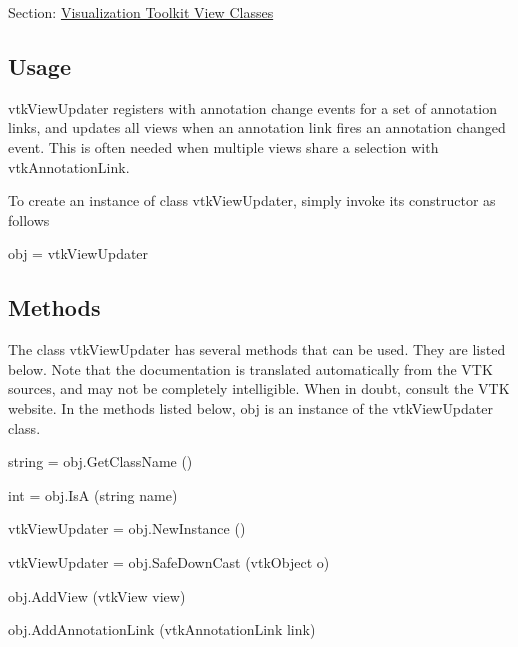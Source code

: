 Section\-: \hyperlink{sec_vtkviews}{Visualization Toolkit View Classes} \hypertarget{vtkwidgets_vtkxyplotwidget_Usage}{}\subsection{Usage}\label{vtkwidgets_vtkxyplotwidget_Usage}
vtk\-View\-Updater registers with annotation change events for a set of annotation links, and updates all views when an annotation link fires an annotation changed event. This is often needed when multiple views share a selection with vtk\-Annotation\-Link.

To create an instance of class vtk\-View\-Updater, simply invoke its constructor as follows \begin{DoxyVerb}  obj = vtkViewUpdater
\end{DoxyVerb}
 \hypertarget{vtkwidgets_vtkxyplotwidget_Methods}{}\subsection{Methods}\label{vtkwidgets_vtkxyplotwidget_Methods}
The class vtk\-View\-Updater has several methods that can be used. They are listed below. Note that the documentation is translated automatically from the V\-T\-K sources, and may not be completely intelligible. When in doubt, consult the V\-T\-K website. In the methods listed below, {\ttfamily obj} is an instance of the vtk\-View\-Updater class. 
\begin{DoxyItemize}
\item {\ttfamily string = obj.\-Get\-Class\-Name ()}  
\item {\ttfamily int = obj.\-Is\-A (string name)}  
\item {\ttfamily vtk\-View\-Updater = obj.\-New\-Instance ()}  
\item {\ttfamily vtk\-View\-Updater = obj.\-Safe\-Down\-Cast (vtk\-Object o)}  
\item {\ttfamily obj.\-Add\-View (vtk\-View view)}  
\item {\ttfamily obj.\-Add\-Annotation\-Link (vtk\-Annotation\-Link link)}  
\end{DoxyItemize}
